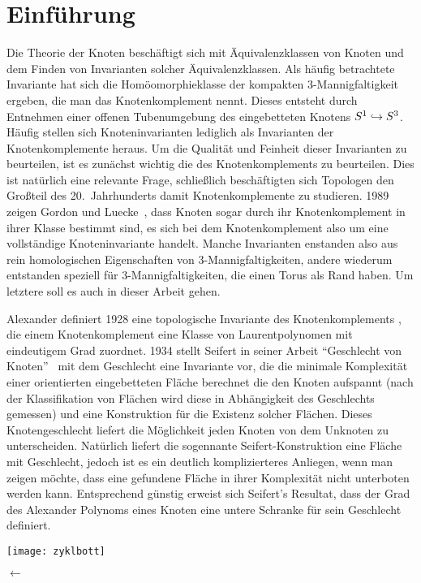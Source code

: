 \section{Einführung}
		
	\begin{minipage}[t][\textheight][t]{0.76\textwidth}

	Die Theorie der Knoten beschäftigt sich mit Äquivalenzklassen von Knoten und dem Finden von Invarianten solcher Äquivalenzklassen. Als häufig betrachtete Invariante hat sich die Homöomorphieklasse der kompakten 3-Mannigfaltigkeit ergeben, die man das Knotenkomplement nennt. Dieses entsteht durch Entnehmen einer offenen Tubenumgebung des eingebetteten Knotens $S^1 \hookrightarrow S^3$. Häufig stellen sich Knoteninvarianten lediglich als Invarianten der Knotenkomplemente heraus. Um die Qualität und Feinheit dieser Invarianten zu beurteilen, ist es zunächst wichtig die des Knotenkomplements zu beurteilen. Dies ist natürlich eine relevante Frage, schließlich beschäftigten sich Topologen den Großteil des 20.~Jahrhunderts damit Knotenkomplemente zu studieren. 1989 zeigen Gordon und Luecke~\cite{Gordon.1989}, dass Knoten sogar durch ihr Knotenkomplement in ihrer Klasse bestimmt sind, es sich bei dem Knotenkomplement also um eine vollständige Knoteninvariante handelt. Manche Invarianten enstanden also aus rein homologischen Eigenschaften von 3-Mannigfaltigkeiten, andere wiederum entstanden speziell für 3-Mannigfaltigkeiten, die einen Torus als Rand haben. Um letztere soll es auch in dieser Arbeit gehen.

	Alexander definiert 1928 eine topologische Invariante des Knotenkomplements \cite{Alexander.1928}, die einem Knotenkomplement eine Klasse von Laurentpolynomen mit eindeutigem Grad zuordnet. 1934 stellt Seifert in seiner Arbeit "`Geschlecht von Knoten"'~\cite{Seifert.1934} mit dem Geschlecht eine Invariante vor, die die minimale Komplexität einer orientierten eingebetteten Fläche berechnet die den Knoten aufspannt (nach der Klassifikation von Flächen wird diese in Abhängigkeit des Geschlechts gemessen) und eine Konstruktion für die Existenz solcher Flächen. Dieses Knotengeschlecht liefert die Möglichkeit jeden Knoten von dem Unknoten zu unterscheiden. Natürlich liefert die sogennante Seifert-Konstruktion eine Fläche mit Geschlecht, jedoch ist es ein deutlich komplizierteres Anliegen, wenn man zeigen möchte, dass eine gefundene Fläche in ihrer Komplexität nicht unterboten werden kann. Entsprechend günstig erweist sich Seifert's Resultat, dass der Grad des Alexander Polynoms eines Knoten eine untere Schranke für sein Geschlecht definiert. 


	\vfill
	\begin{minipage}[t]{0.7\textwidth}
		\texttt{[image: zyklbott]} 
	\end{minipage}
	\begin{minipage}[t]{0.2\textwidth}
	\vspace{-1cm}
	\huge$\longleftarrow$
	\vfill

	\end{minipage}
	\vspace{.63cm}
		 \label{fig:zykl}
	\end{minipage}
